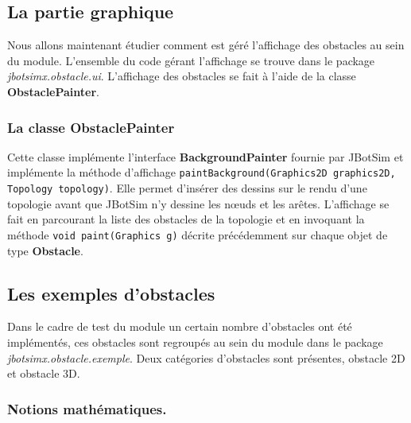 \documentclass{article}
\begin{document}
\subsection{La partie graphique}

Nous allons maintenant étudier comment est géré l'affichage des obstacles au sein du module. L'ensemble du code gérant l'affichage se trouve dans le package \emph{jbotsimx.obstacle.ui}.
L'affichage des obstacles se fait à l'aide de la classe \textbf{ObstaclePainter}.


\subsubsection{La classe ObstaclePainter}

Cette classe implémente l'interface \textbf{BackgroundPainter} fournie par JBotSim et implémente la méthode d'affichage \texttt{paintBackground(Graphics2D gra\-phics2D, Topology topology)}.
Elle permet d'insérer des dessins sur le rendu d'une topologie avant que JBotSim n'y dessine les nœuds et les arêtes.
L'affichage se fait en parcourant la liste des obstacles de la topologie et en invoquant la méthode \texttt{void paint(Graphics g)} décrite précédemment  sur chaque objet de type \textbf{Obstacle}.

\subsection{Les exemples d'obstacles}

Dans le cadre de test du module un certain nombre d'obstacles ont été implémentés, ces obstacles sont regroupés au sein du module dans le package \emph{jbotsimx.obstacle.exemple}. Deux catégories d'obstacles sont présentes, obstacle 2D et obstacle 3D.

\subsubsection{Notions mathématiques.}
\end{document}
